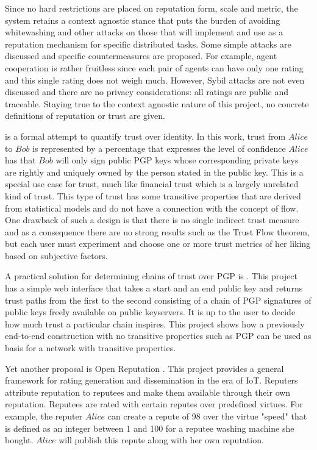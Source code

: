  Since no hard restrictions are placed on reputation form, scale and metric, the system retains a context agnostic stance
  that puts the burden of avoiding whitewashing and other attacks on those that will implement and use \cite{ghkkw} as a
  reputation mechanism for specific distributed tasks. Some simple attacks are discussed and specific countermeasures are
  proposed. For example, agent cooperation is rather fruitless since each pair of agents can have only one rating and this
  single rating does not weigh much. However, Sybil attacks are not even discussed and there are no privacy considerations:
  all ratings are public and traceable. Staying true to the context agnostic nature of this project, no concrete definitions
  of reputation or trust are given.

  \cite{wot} is a formal attempt to quantify trust over identity. In this work, trust from $Alice$ to $Bob$ is represented by
  a percentage that expresses the level of confidence $Alice$ has that $Bob$ will only sign public PGP keys whose
  corresponding private keys are rightly and uniquely owned by the person stated in the public key. This is a special use
  case for trust, much like financial trust which is a largely unrelated kind of trust. This type of trust has some
  transitive properties that are derived from statistical models and do not have a connection with the concept of flow. One
  drawback of such a design is that there is no single indirect trust measure and as a consequence there are no strong
  results such as the Trust Flow theorem, but each user must experiment and choose one or more trust metrics of her liking
  based on subjective factors.

  A practical solution for determining chains of trust over PGP is \cite{pathfinder}. This project has a simple web interface
  that takes a start and an end public key and returns trust paths from the first to the second consisting of a chain of PGP
  signatures of public keys freely available on public keyservers. It is up to the user to decide how much trust a particular
  chain inspires. This project shows how a previously end-to-end construction with no transitive properties such as PGP can
  be used as basis for a network with transitive properties.

  Yet another proposal is Open Reputation \cite{openrep}. This project provides a general framework for rating generation and
  dissemination in the era of IoT. Reputers attribute reputation to reputees and make them available through their own
  reputation. Reputees are rated with certain reputes over predefined virtues. For example, the reputer $Alice$ can create
  a repute of 98 over the virtue "speed" that is defined as an integer between 1 and 100 for a reputee washing machine she
  bought. $Alice$ will publish this repute along with her own reputation.

